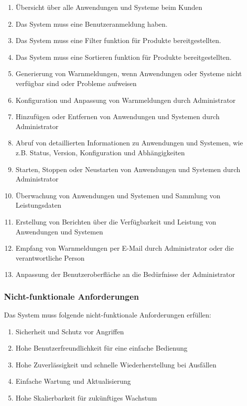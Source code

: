\begin{enumerate}
\item Übersicht über alle Anwendungen und Systeme beim Kunden
\item Das System muss eine Benutzeranmeldung haben.
\item Das System muss eine Filter funktion für Produkte bereitgestellten.
\item Das System muss eine Sortieren funktion für Produkte bereitgestellten.
\item Generierung von Warnmeldungen, wenn Anwendungen oder Systeme nicht verfügbar sind oder Probleme aufweisen
\item Konfiguration und Anpassung von Warnmeldungen durch Administrator
\item Hinzufügen oder Entfernen von Anwendungen und Systemen durch Administrator
\item Abruf von detaillierten Informationen zu Anwendungen und Systemen, wie z.B. Status, Version, Konfiguration und Abhängigkeiten
\item Starten, Stoppen oder Neustarten von Anwendungen und Systemen durch Administrator
\item Überwachung von Anwendungen und Systemen und Sammlung von Leistungsdaten
\item Erstellung von Berichten über die Verfügbarkeit und Leistung von Anwendungen und Systemen
\item Empfang von Warnmeldungen per E-Mail durch Administrator oder die verantwortliche Person
\item Anpassung der Benutzeroberfläche an die Bedürfnisse der Administrator
\end{enumerate}

\subsubsection{Nicht-funktionale Anforderungen}

Das System muss folgende nicht-funktionale Anforderungen erfüllen:

\begin{enumerate}
\item Sicherheit und Schutz vor Angriffen
\item Hohe Benutzerfreundlichkeit für eine einfache Bedienung
\item Hohe Zuverlässigkeit und schnelle Wiederherstellung bei Ausfällen
\item Einfache Wartung und Aktualisierung
\item Hohe Skalierbarkeit für zukünftiges Wachstum
\end{enumerate}

